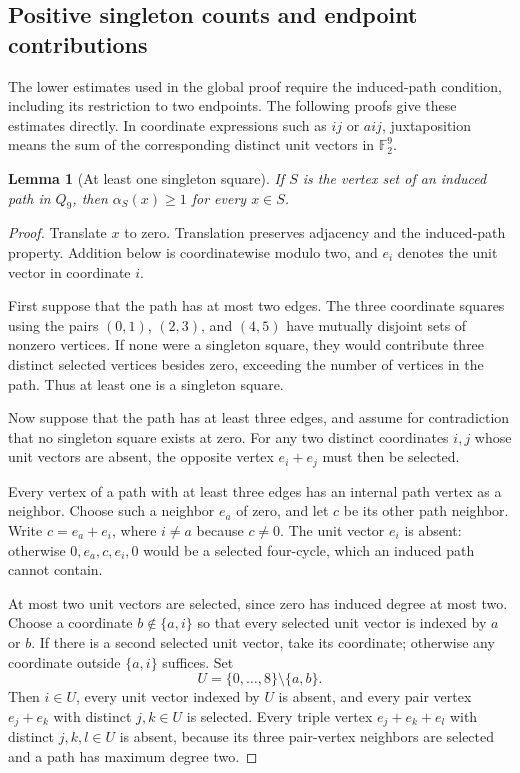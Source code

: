 \documentclass[11pt,a4paper]{article}
\newtheorem{lemma}[theorem]{Lemma}
\theoremstyle{definition}
\theoremstyle{remark}
\newcommand{\Q}{Q}
\begin{document}
\subsection{Positive singleton counts and endpoint contributions}
The lower estimates used in the global proof require the induced-path condition, including its restriction to two endpoints. The following proofs give these estimates directly. In coordinate expressions such as $ij$ or $aij$, juxtaposition means the sum of the corresponding distinct unit vectors in $\mathbb F_2^9$.

\begin{lemma}[At least one singleton square]\label{lem:one-square}
If $S$ is the vertex set of an induced path in $\Q_9$, then $\alpha_S(x)\ge1$ for every $x\in S$.
\end{lemma}
\begin{proof}
Translate $x$ to zero. Translation preserves adjacency and the induced-path property. Addition below is coordinatewise modulo two, and $e_i$ denotes the unit vector in coordinate $i$.

First suppose that the path has at most two edges. The three coordinate squares using the pairs $(0,1)$, $(2,3)$, and $(4,5)$ have mutually disjoint sets of nonzero vertices. If none were a singleton square, they would contribute three distinct selected vertices besides zero, exceeding the number of vertices in the path. Thus at least one is a singleton square.

Now suppose that the path has at least three edges, and assume for contradiction that no singleton square exists at zero. For any two distinct coordinates $i,j$ whose unit vectors are absent, the opposite vertex $e_i+e_j$ must then be selected.

Every vertex of a path with at least three edges has an internal path vertex as a neighbor. Choose such a neighbor $e_a$ of zero, and let $c$ be its other path neighbor. Write $c=e_a+e_i$, where $i\ne a$ because $c\ne0$. The unit vector $e_i$ is absent: otherwise $0,e_a,c,e_i,0$ would be a selected four-cycle, which an induced path cannot contain.

At most two unit vectors are selected, since zero has induced degree at most two. Choose a coordinate $b\notin\{a,i\}$ so that every selected unit vector is indexed by $a$ or $b$. If there is a second selected unit vector, take its coordinate; otherwise any coordinate outside $\{a,i\}$ suffices. Set
\[
U=\{0,\ldots,8\}\setminus\{a,b\}.
\]
Then $i\in U$, every unit vector indexed by $U$ is absent, and every pair vertex $e_j+e_k$ with distinct $j,k\in U$ is selected. Every triple vertex $e_j+e_k+e_l$ with distinct $j,k,l\in U$ is absent, because its three pair-vertex neighbors are selected and a path has maximum degree two.


\end{proof}
\end{document}
